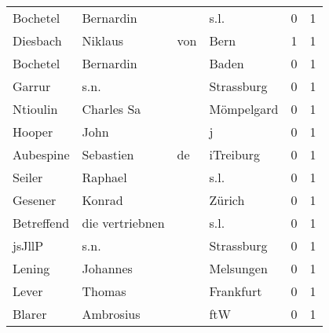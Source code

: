\documentclass[10pt,a4paper,landscape]{article}
\begin{document}
\begin{longtable}{llllrr}
                 Bochetel &                          Bernardin &             &                                        s.l. &          0 &         1 \\
                 Diesbach &                            Niklaus &         von &                                        Bern &          1 &         1 \\
                 Bochetel &                          Bernardin &             &                                       Baden &          0 &         1 \\
                   Garrur &                               s.n. &             &                                  Strassburg &          0 &         1 \\
                 Ntioulin &                         Charles Sa &             &                                  Mömpelgard &          0 &         1 \\
                   Hooper &                               John &             &                                           j &          0 &         1 \\
                Aubespine &                          Sebastien &          de &                                   iTreiburg &          0 &         1 \\
                   Seiler &                            Raphael &             &                                        s.l. &          0 &         1 \\
                  Gesener &                             Konrad &             &                                      Zürich &          0 &         1 \\
               Betreffend &                    die vertriebnen &             &                                        s.l. &          0 &         1 \\
                   jsJllP &                               s.n. &             &                                  Strassburg &          0 &         1 \\
                   Lening &                           Johannes &             &                                   Melsungen &          0 &         1 \\
                    Lever &                             Thomas &             &                                   Frankfurt &          0 &         1 \\
                   Blarer &                          Ambrosius &             &                                         ftW &          0 &         1 \\

\end{longtable}
\end{document}
